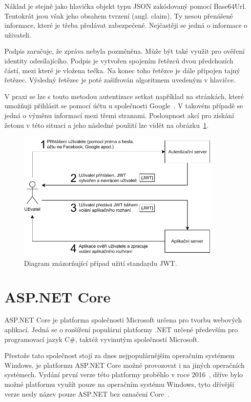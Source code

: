 Náklad je stejně jako hlavička objekt typu JSON zakódovaný pomocí Base64Url. Tentokrát jsou však jeho obsahem tvrzení (angl. claim). Ty nesou přenášené informace, které je třeba předávat zabezpečené. Nejčastěji se jedná o informace o uživateli.

Podpis zaručuje, že zpráva nebyla pozměněna. Může být také využit pro ověření identity odesílajícího. Podpis je vytvořen spojením řetězců dvou předchozích částí, mezi které je vložena tečka. Na konec toho řetězce je dále připojen tajný řetězec. Výsledný řetězec je poté zašifrován algoritmem uvedeným v hlavičce. 

V praxi se lze s touto metodou autentizace setkat například na stránkách, které umožňuji přihlásit se pomocí účtu u společnosti Google~\cite{bib:google-jwt}. V takovém případě se jedná o výměnu informací mezi třemi stranami. Posloupnost akcí pro získání žetonu v této situaci a jeho následné použití lze vidět na obrázku~\ref{img:jwt}.

\begin{figure}[H]
    \label{img:jwt}
	\centering
	\includegraphics[width=0.9\textwidth]{obrazky-figures/jwt.pdf}
	\caption{Diagram znázorňující případ užití standardu JWT.}
\end{figure}

\section{ASP.NET Core}
ASP.NET Core je platforma společnosti Microsoft určena pro tvorbu webových aplikací. Jedná se o rozšíření populární platformy .NET určené především pro programovací jazyk C\#, taktéž vyvinutým společností Microsoft.

Přestože tato společnost stojí za dnes nejpopulárnějším operačním systémem Windows, je platformu ASP.NET Core možné provozovat i na jiných operačních systémech. Vydání první verze této platformy proběhlo v roce 2016~\cite{bib:asp-release}, dříve bylo možné platformu využít pouze na operačním systému Windows, tyto dřívější verze nesly název pouze ASP.NET bez označení Core~\cite{bib:asp-what-is}.


